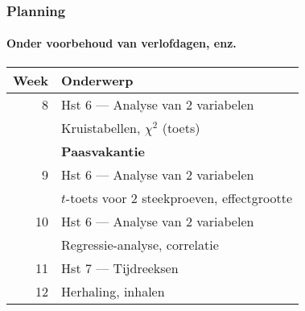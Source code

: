 \documentclass[aspectratio=169]{beamer}
\begin{document}
\begin{frame}
  \frametitle{Planning}
  \framesubtitle{Onder voorbehoud van verlofdagen, enz.}
  
  \centering
  \begin{tabular}{rl}
    \toprule
    \textbf{Week} & \textbf{Onderwerp}                                \\
    \midrule
     8 & Hst 6 --- Analyse van 2 variabelen                           \\
       & \hspace{1.25cm} Kruistabellen, $\chi^2$ (toets)              \\
       & \textbf{Paasvakantie}                                        \\
     9 & Hst 6 --- Analyse van 2 variabelen                           \\
       & \hspace{1.25cm} $t$-toets voor 2 steekproeven, effectgrootte \\
    10 & Hst 6 --- Analyse van 2 variabelen                           \\
       & \hspace{1.25cm} Regressie-analyse, correlatie                \\
    11 & Hst 7 --- Tijdreeksen                                        \\
    12 & Herhaling, inhalen                                           \\
  \end{tabular}
  
\end{frame}
\end{document}
